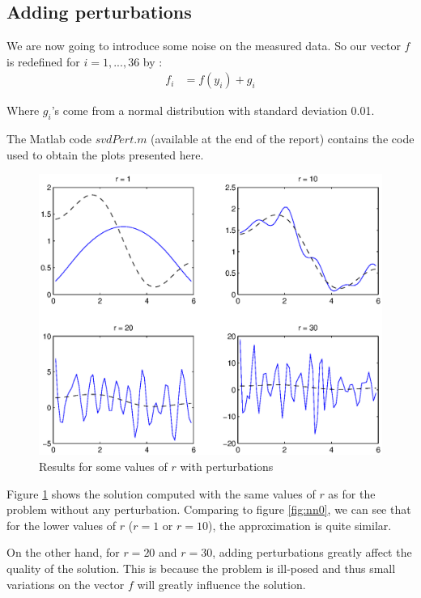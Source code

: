 \subsection*{Adding perturbations}

We are now going to introduce some noise on the measured data. So our vector $f$ is redefined for $i=1,...,36$ by :
\begin{align*}
f_i&=f(y_i)+g_i 
\end{align*}

Where $g_i$'s come from a normal distribution with standard deviation 0.01. 

The Matlab code $svdPert.m$ (available at the end of the report) contains the code used to obtain the plots presented here.

\begin{figure}
\begin{center}
\includegraphics[scale=0.6]{perturb.eps}
\caption{Results for some values of $r$ with perturbations}
\label{perturb}
\end{center}
\end{figure}

Figure \ref{perturb} shows the solution computed with the same values of $r$ as for the problem without any perturbation. Comparing to figure \ref{fig:nn0}, we can see that for the lower values of $r$ ($r=1$ or $r=10$), the approximation is quite similar. 

On the other hand, for $r=20$ and $r=30$, adding perturbations greatly affect the quality of the solution. This is because the problem is ill-posed and thus small variations on the vector $f$ will greatly influence the solution.

